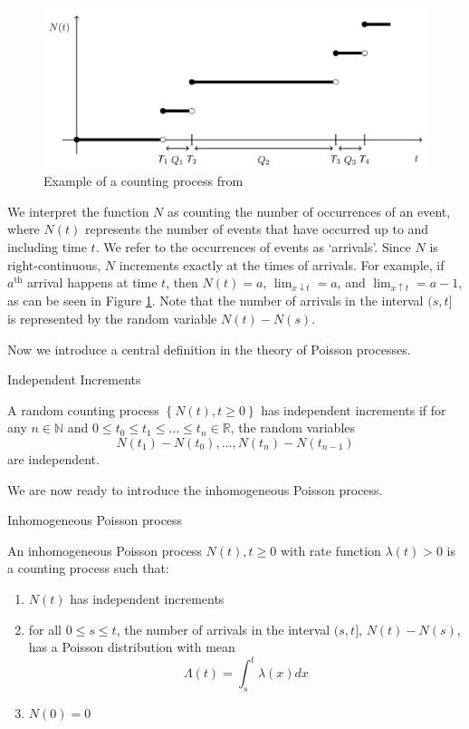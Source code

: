 \begin{figure}[h]
	\centering
	\includegraphics[width=\textwidth]{./figures/poisson_process_example.png}
	\caption{Example of a counting process from \cite{countingProcessFigure}}
	\label{fig:poissonProcessExample}
\end{figure}

We interpret the function $N$ as counting the number of occurrences of an event, where $N(t)$ represents the number of events that have occurred up to and including time $t$. We refer to the occurrences of events as `arrivals'.  Since $N$ is right-continuous, $N$ increments exactly at the times of arrivals. For example, if $a^\text{th}$ arrival happens at time $t$, then $N(t) = a$, $\lim_{x \downarrow t} = a$, and $\lim_{x \uparrow t} = a - 1$, as can be seen in Figure \ref{fig:poissonProcessExample}. Note that the number of arrivals in the interval $(s, t]$ is represented by the random variable $N(t) - N(s)$. 

Now we introduce a central definition in the theory of Poisson processes.

\begin{definition}
	Independent Increments

	A random counting process $\left\{ N(t), t \geq 0 \right\}$ has independent increments if for any $n \in \mathbb{N}$ and $0 \leq t_0 \leq t_1 \leq \dots \leq t_n \in \mathbb{R}$,
	the random variables
	$$
		N(t_1) - N(t_0), \dots, N(t_n) - N(t_{n - 1})
	$$
	are independent.
\end{definition}

We are now ready to introduce the inhomogeneous Poisson process.

\begin{definition}\label{defn:inhomoPP}
	Inhomogeneous Poisson process

	\noindent
	An inhomogeneous Poisson process ${N(t), t \geq 0}$ with rate function $\lambda(t) > 0$ is a counting process such that:
	\begin{enumerate}
		\item $N(t)$ has independent increments
		\item for all $0 \leq s \leq t$, 
		the number of arrivals in the interval $(s, t]$, 
		$N(t) - N(s)$, has a Poisson distribution with mean
		$$
			\Lambda(t) = \int_s^t \lambda(x) dx
		$$
		\item $N(0) = 0$
	\end{enumerate}
\end{definition}


